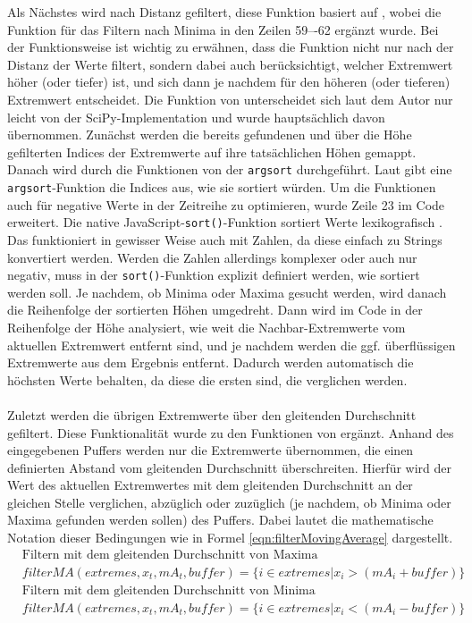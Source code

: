 Als Nächstes wird nach Distanz gefiltert, diese Funktion basiert auf \cite{SamuelProll.2022}, wobei die Funktion für das Filtern nach Minima in den Zeilen 59–-62 ergänzt wurde. Bei der Funktionsweise ist wichtig zu erwähnen, dass die Funktion nicht nur nach der Distanz der Werte filtert, sondern dabei auch berücksichtigt, welcher Extremwert höher (oder tiefer) ist, und sich dann je nachdem für den höheren (oder tieferen) Extremwert entscheidet. Die Funktion von \cite{SamuelProll.2022} unterscheidet sich laut dem Autor nur leicht von der SciPy-Implementation und wurde hauptsächlich davon übernommen. Zunächst werden die bereits gefundenen und über die Höhe gefilterten Indices der Extremwerte auf ihre tatsächlichen Höhen gemappt. Danach wird durch die Funktionen von \cite{EranW.2020} der \texttt{argsort} durchgeführt. Laut \cite{NumPyDevelopers.2024} gibt eine \texttt{argsort}-Funktion die Indices aus, wie sie sortiert würden. Um die Funktionen auch für negative Werte in der Zeitreihe zu optimieren, wurde Zeile 23 im Code erweitert. Die native JavaScript-\texttt{sort()}-Funktion sortiert Werte lexikografisch \cite{MDNcontributors.2024}. Das funktioniert in gewisser Weise auch mit Zahlen, da diese einfach zu Strings konvertiert werden. Werden die Zahlen allerdings komplexer oder auch nur negativ, muss in der \texttt{sort()}-Funktion explizit definiert werden, wie sortiert werden soll. Je nachdem, ob Minima oder Maxima gesucht werden, wird danach die Reihenfolge der sortierten Höhen umgedreht. Dann wird im Code in der Reihenfolge der Höhe analysiert, wie weit die Nachbar-Extremwerte vom aktuellen Extremwert entfernt sind, und je nachdem werden die ggf. überflüssigen Extremwerte aus dem Ergebnis entfernt. Dadurch werden automatisch die höchsten Werte behalten, da diese die ersten sind, die verglichen werden.\\\\Zuletzt werden die übrigen Extremwerte über den gleitenden Durchschnitt gefiltert. Diese Funktionalität wurde zu den Funktionen von \cite{SamuelProll.2022} ergänzt. Anhand des eingegebenen Puffers werden nur die Extremwerte übernommen, die einen definierten Abstand vom gleitenden Durchschnitt überschreiten. Hierfür wird der Wert des aktuellen Extremwertes mit dem gleitenden Durchschnitt an der gleichen Stelle verglichen, abzüglich oder zuzüglich (je nachdem, ob Minima oder Maxima gefunden werden sollen) des Puffers. Dabei lautet die mathematische Notation dieser Bedingungen wie in Formel \ref{eqn:filterMovingAverage} dargestellt.
\begin{equation}
\label{eqn:filterMovingAverage}
    \begin{split}
        &\text{Filtern mit dem gleitenden Durchschnitt von Maxima}\\
        &filterMA(extremes,x_t,mA_t, buffer) = \{i \in extremes|x_i>(mA_i+buffer)\}\\
        &\text{Filtern mit dem gleitenden Durchschnitt von Minima}\\
        &filterMA(extremes,x_t,mA_t, buffer) = \{i \in extremes|x_i<(mA_i-buffer)\}
        \\\\
    \end{split}
\end{equation}
